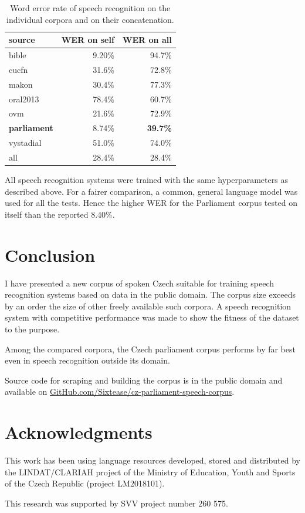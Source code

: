 \documentclass[conference]{IEEEtran}
\begin{document}
\begin{table}[htpb]
\caption{Word error rate of speech recognition on the individual corpora and on
their concatenation.}
\centering
\begin{tabular}{|l||r|r|}
\hline
source    & WER on self & WER on all \\
\hline
bible     & 9.20\%  & 94.7\% \\
cucfn     & 31.6\%  & 72.8\% \\
makon     & 30.4\%  & 77.3\% \\
oral2013  & 78.4\%  & 60.7\% \\
ovm       & 21.6\%  & 72.9\% \\
\textbf{parliament}
          & 8.74\%  & \textbf{39.7\%} \\
vystadial & 51.0\%  & 74.0\% \\
\hline
all       & 28.4\%  & 28.4\% \\
\hline
\end{tabular}
\label{tab:csasr:results}
\end{table}

All speech recognition systems were trained with the same hyperparameters as
described above. For a fairer comparison, a common, general language model was
used for all the tests. Hence the higher WER for the Parliament corpus tested on
itself than the reported 8.40\%.

\section{Conclusion}

I have presented a new corpus of spoken Czech suitable for training speech
recognition systems based on data in the public domain. The corpus size exceeds
by an order the size of other freely available such corpora. A speech
recognition system with competitive performance was made to show the fitness
of the dataset to the purpose.

Among the compared corpora, the Czech parliament corpus performs by far best
even in speech recognition outside its domain.

Source code for scraping and building the corpus is in the public domain and
available on 
\url{GitHub.com/Sixtease/cz-parliament-speech-corpus}.

\section*{Acknowledgments}

This work has been using language resources developed, stored and distributed by
the LINDAT/CLARIAH project of the Ministry of Education, Youth and Sports of the
Czech Republic (project LM2018101).

This research was supported by SVV project number 260 575.



\end{document}
